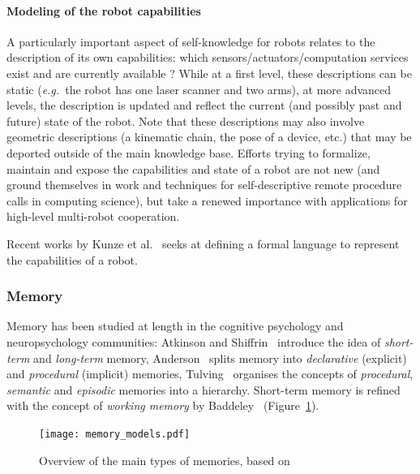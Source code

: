 \documentclass[a4paper, twocolumn]{article}
\newcommand{\eg}{{\textit{e.g.\ }}}
\begin{document}
\paragraph{Modeling of the robot capabilities}

A particularly important aspect of self-knowledge for robots relates to the
description of its own capabilities: which sensors/actuators/computation
services exist and are currently available ?  While at a first level, these
descriptions can be static (\eg the robot has one laser scanner and two arms),
at more advanced levels, the description is updated and reflect the current
(and possibly past and future) state of the robot. Note that these descriptions
may also involve geometric descriptions (a kinematic chain, the pose of a
device, etc.) that may be deported outside of the main knowledge base. Efforts
trying to formalize, maintain and expose the capabilities and state of a robot
are not new (and ground themselves in work and techniques for self-descriptive
remote procedure calls in computing science), but take a renewed importance
with applications for high-level multi-robot cooperation.

Recent works by Kunze et al.~\cite{Kunze2011} seeks at defining a formal
language to represent the capabilities of a robot.

\subsubsection{Memory}
\label{sect|memory}

Memory has been studied at length in the cognitive psychology and
neuropsychology communities: Atkinson and Shiffrin~\cite{Atkinson1968}
introduce the idea of \emph{short-term} and \emph{long-term} memory,
Anderson~\cite{Anderson1976} splits memory into \emph{declarative} (explicit)
and \emph{procedural} (implicit) memories, Tulving~\cite{Tulving1985} organises
the concepts of \emph{procedural}, \emph{semantic} and \emph{episodic} memories
into a hierarchy. Short-term memory is refined with the concept of
\emph{working memory} by Baddeley~\cite{Baddeley2010}
(Figure~\ref{fig|memory_models}).

\begin{figure}
    \centering
    \texttt{[image: memory\_models.pdf]}
    \caption{Overview of the main types of memories, based
    on~\cite{Atkinson1968, Anderson1976, Tulving1985, Baddeley2010}}

    \label{fig|memory_models}
\end{figure}
\end{document}
